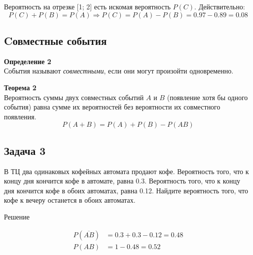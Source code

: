 \documentclass[a4paper,12pt]{article}
\begin{document}
Вероятность на отрезке [1; 2] есть искомая вероятность $P(C)$. Действительно:
$$P(C)+P(B)=P(A)\Rightarrow{}P(C)=P(A)-P(B)=0.97-0.89=0.08$$

\subsection{Cовместные события}

\textbf{Определение 2}\\
События называют \textit{совместными}, если они могут произойти одновременно.

\textbf{Теорема 2}\\
Вероятность суммы двух совместных событий $A$ и $B$ (появление хотя бы одного события) равна сумме их вероятностей без вероятности их совместного появления.
$$P(A+B)=P(A)+P(B)-P(AB)$$


\subsection*{Задача 3}
В ТЦ два одинаковых кофейных автомата продают кофе. Вероятность того, что к концу дня кончится кофе в автомате, равна 0.3.  Вероятность того, что к концу дня кончится кофе в обоих автоматах, равна 0.12. Найдите вероятность того, что кофе к вечеру останется в обоих автоматах.
\begin{center}
Решение
\end{center}
\begin{align*}
P(\overline{AB})&=0.3+0.3-0.12=0.48\\
P(AB) &= 1-0.48=0.52    
\end{align*}
\end{document}
